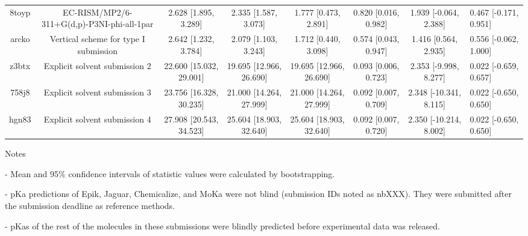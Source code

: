 \documentclass{article}
\begin{document}
\begin{center}
\begin{longtable}{|ccccccc|}
 8toyp &         EC-RISM/MP2/6-311+G(d,p)-P3NI-phi-all-1par &     2.628 [1.895, 3.289] &     2.335 [1.587, 3.073] &     1.777 [0.473, 2.891] &  0.820 [0.016, 0.982] &   1.939 [-0.064, 2.388] &  0.467 [-0.171, 0.951] \\
 arcko &              Vertical scheme for type I submission &     2.642 [1.232, 3.784] &     2.079 [1.103, 3.243] &     1.712 [0.440, 3.098] &  0.574 [0.043, 0.947] &    1.416 [0.564, 2.935] &  0.556 [-0.062, 1.000] \\
 z3btx &                      Explicit solvent submission 2 &  22.600 [15.032, 29.001] &  19.695 [12.966, 26.690] &  19.695 [12.966, 26.690] &  0.093 [0.006, 0.723] &   2.353 [-9.998, 8.277] &  0.022 [-0.659, 0.657] \\
 758j8 &                      Explicit solvent submission 3 &  23.756 [16.328, 30.235] &  21.000 [14.264, 27.999] &  21.000 [14.264, 27.999] &  0.092 [0.007, 0.709] &  2.348 [-10.341, 8.115] &  0.022 [-0.650, 0.650] \\
 hgn83 &                      Explicit solvent submission 4 &  27.908 [20.543, 34.523] &  25.604 [18.903, 32.640] &  25.604 [18.903, 32.640] &  0.092 [0.007, 0.720] &  2.350 [-10.214, 8.002] &  0.022 [-0.650, 0.650] \\
\end{longtable}
\end{center}

Notes

- Mean and 95\% confidence intervals of statistic values were calculated by bootstrapping.

- pKa predictions of Epik, Jaguar, Chemicalize, and MoKa were not blind (submission IDs noted as nbXXX). They were submitted after the submission deadline as reference methods.

- pKas of the rest of the molecules in these submissions were blindly predicted before experimental data was released.
\end{document}
